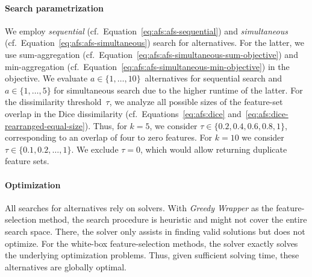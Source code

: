 \documentclass{article}
\theoremstyle{definition}
\begin{document}
\paragraph{Search parametrization}

We employ \emph{sequential} (cf.~Equation~\ref{eq:afs:afs-sequential}) and \emph{simultaneous} (cf.~Equation~\ref{eq:afs:afs-simultaneous}) search for alternatives.
For the latter, we use sum-aggregation (cf.~Equation~\ref{eq:afs:afs-simultaneous-sum-objective}) and min-aggregation (cf.~Equation~\ref{eq:afs:afs-simultaneous-min-objective}) in the objective.
We evaluate $a \in \{1, \dots, 10\}$~alternatives for sequential search and $a \in \{1, \dots, 5\}$ for simultaneous search due to the higher runtime of the latter.
For the dissimilarity threshold~$\tau$, we analyze all possible sizes of the feature-set overlap in the Dice dissimilarity (cf.~Equations~\ref{eq:afs:dice} and~\ref{eq:afs:dice-rearranged-equal-size}).
Thus, for $k=5$, we consider $\tau \in \{0.2, 0.4, 0.6, 0.8, 1\}$, corresponding to an overlap of four to zero features.
For $k=10$ we consider $\tau \in \{0.1, 0.2, \dots, 1\}$.
We exclude $\tau = 0$, which would allow returning duplicate feature sets.

\paragraph{Optimization}

All searches for alternatives rely on solvers.
With \emph{Greedy Wrapper} as the feature-selection method, the search procedure is heuristic and might not cover the entire search space.
There, the solver only assists in finding valid solutions but does not optimize.
For the white-box feature-selection methods, the solver exactly solves the underlying optimization problems.
Thus, given sufficient solving time, these alternatives are globally optimal.
\end{document}
